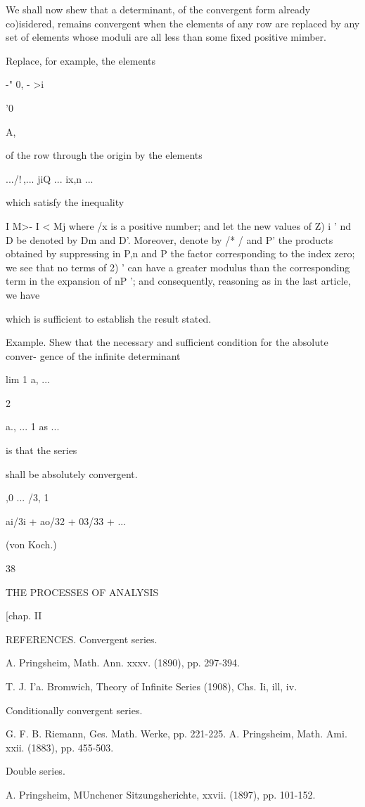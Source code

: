 We shall now shew that a determinant, of the convergent form already
co)isidered, remains convergent when the elements of any row are
replaced by any set of elements whose moduli are all less than some
fixed positive mimber.

Replace, for example, the elements

-" 0, - >i

'0

A,

of the row through the origin by the elements

.../!\,,... jiQ ... ix,n ...

which satisfy the inequality

I M>- I < Mj where /x is a positive number; and let the new values of
Z) i ' nd D be denoted by Dm and D'. Moreover, denote by /* / and P'
the products obtained by suppressing in P,n and P the factor
corresponding to the index zero; we see that no terms of 2) ' can
have a greater modulus than the corresponding term in the expansion of
nP '; and consequently, reasoning as in the last article, we have

which is sufficient to establish the result stated.

Example. Shew that the necessary and sufficient condition for the
absolute conver- gence of the infinite determinant

lim 1 a, ...

 2

a., ... 1 as ...

is that the series

shall be absolutely convergent.

,0 ... /3, 1

ai/3i + ao/32 + 03/33 + ...

(von Koch.)

38

THE PROCESSES OF ANALYSIS

[chap. II

REFERENCES. Convergent series.

A. Pringsheim, Math. Ann. xxxv. (1890), pp. 297-394.

T. J. I'a. Bromwich, Theory of Infinite Series (1908), Chs. Ii, ill,
iv.

Conditionally convergent series.

G. F. B. Riemann, Ges. Math. Werke, pp. 221-225. A. Pringsheim, Math.
Ami. xxii. (1883), pp. 455-503.

Double series.

A. Pringsheim, MUnchener Sitzungsherichte, xxvii. (1897), pp. 101-152.

